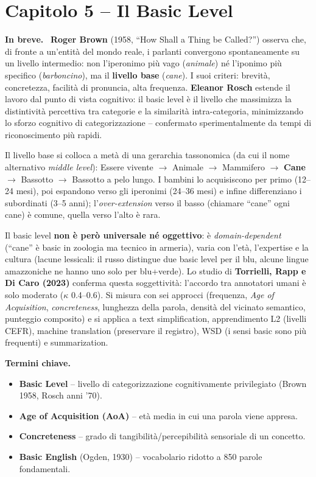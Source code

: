 \documentclass[11pt,a4paper]{article}
\newcommand{\spiega}{\medskip\noindent\textbf{\textcolor{blue!45!black}{In breve.}}\ }
\newcommand{\termini}{\medskip\noindent\textbf{\textcolor{blue!45!black}{Termini chiave.}}}
\begin{document}
\section*{Capitolo 5 -- Il Basic Level}

\spiega
\textbf{Roger Brown} (1958, ``How Shall a Thing be Called?'') osserva che, di fronte a un'entit\`a del mondo reale, i parlanti convergono spontaneamente su un livello intermedio: non l'iperonimo pi\`u vago (\emph{animale}) n\'e l'iponimo pi\`u specifico (\emph{barboncino}), ma il \textbf{livello base} (\emph{cane}). I suoi criteri: brevit\`a, concretezza, facilit\`a di pronuncia, alta frequenza. \textbf{Eleanor Rosch} estende il lavoro dal punto di vista cognitivo: il basic level \`e il livello che massimizza la distintivit\`a percettiva tra categorie e la similarit\`a intra-categoria, minimizzando lo sforzo cognitivo di categorizzazione -- confermato sperimentalmente da tempi di riconoscimento pi\`u rapidi.

Il livello base si colloca a met\`a di una gerarchia tassonomica (da cui il nome alternativo \emph{middle level}): Essere vivente $\to$ Animale $\to$ Mammifero $\to$ \textbf{Cane} $\to$ Bassotto $\to$ Bassotto a pelo lungo. I bambini lo acquisiscono per primo (12--24 mesi), poi espandono verso gli iperonimi (24--36 mesi) e infine differenziano i subordinati (3--5 anni); l'\emph{over-extension} verso il basso (chiamare ``cane'' ogni cane) \`e comune, quella verso l'alto \`e rara.

Il basic level \textbf{non \`e per\`o universale n\'e oggettivo}: \`e \emph{domain-dependent} (``cane'' \`e basic in zoologia ma tecnico in armeria), varia con l'et\`a, l'expertise e la cultura (lacune lessicali: il russo distingue due basic level per il blu, alcune lingue amazzoniche ne hanno uno solo per blu+verde). Lo studio di \textbf{Torrielli, Rapp e Di Caro (2023)} conferma questa soggettivit\`a: l'accordo tra annotatori umani \`e solo moderato ($\kappa$ 0.4--0.6). Si misura con sei approcci (frequenza, \emph{Age of Acquisition}, \emph{concreteness}, lunghezza della parola, densit\`a del vicinato semantico, punteggio composito) e si applica a text simplification, apprendimento L2 (livelli CEFR), machine translation (preservare il registro), WSD (i sensi basic sono pi\`u frequenti) e summarization.

\termini
\begin{itemize}
\item \textbf{Basic Level} -- livello di categorizzazione cognitivamente privilegiato (Brown 1958, Rosch anni '70).
\item \textbf{Age of Acquisition (AoA)} -- et\`a media in cui una parola viene appresa.
\item \textbf{Concreteness} -- grado di tangibilit\`a/percepibilit\`a sensoriale di un concetto.
\item \textbf{Basic English} (Ogden, 1930) -- vocabolario ridotto a 850 parole fondamentali.
\end{itemize}
\end{document}
